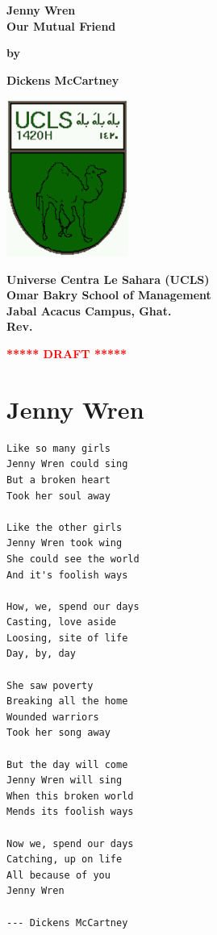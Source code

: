 \documentclass[12pt]{article}
\newcommand{\pengarangs}{%
    Dickens McCartney\\
}
\newcommand{\judul}{%
Jenny Wren\\[13pt]
Our Mutual Friend
}
\begin{document}
\begin{titlepage}
    \begin{center}    

    \vspace*{15mm}
    \textbf{\Large \judul}

    \vspace*{30mm}       
    \textbf{by}

    \vspace*{15mm}    
    \textbf{\Large \pengarangs}

    \vspace*{4.0cm}

    \begin{center}
        \includegraphics[width=40mm]{ucls-coat}
    \end{center}

    \textbf{
       Universe Centra Le Sahara (UCLS)\\[11pt]
       Omar Bakry School of Management\\[11pt]
       Jabal Acacus Campus, Ghat. \\[11pt]
       Rev. \rev%
    }

    \vspace*{5mm}    
    \textbf{\LARGE \textcolor{red}{***** DRAFT *****}}

    \end{center}

\end{titlepage}


\section*{Jenny Wren}

\begin{verbatim}
Like so many girls
Jenny Wren could sing
But a broken heart
Took her soul away

Like the other girls
Jenny Wren took wing
She could see the world
And it's foolish ways

How, we, spend our days
Casting, love aside
Loosing, site of life
Day, by, day

She saw poverty
Breaking all the home
Wounded warriors
Took her song away

But the day will come
Jenny Wren will sing
When this broken world
Mends its foolish ways

Now we, spend our days
Catching, up on life
All because of you
Jenny Wren

--- Dickens McCartney
\end{verbatim}
\end{document}
